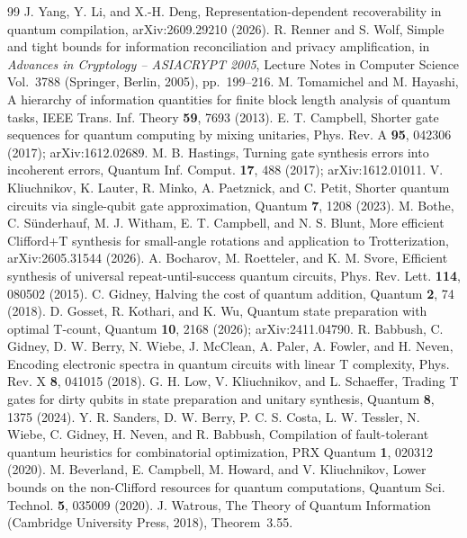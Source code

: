 \documentclass[aps,prx,twocolumn,superscriptaddress,nofootinbib,longbibliography]{revtex4-2}
\theoremstyle{plain}
\theoremstyle{definition}
\theoremstyle{remark}
\begin{document}
\begin{thebibliography}{99}
 J. Yang, Y. Li, and X.-H. Deng, Representation-dependent recoverability in quantum compilation, arXiv:2609.29210 (2026).
 R. Renner and S. Wolf, Simple and tight bounds for information reconciliation and privacy amplification, in \emph{Advances in Cryptology -- ASIACRYPT 2005}, Lecture Notes in Computer Science Vol.~3788 (Springer, Berlin, 2005), pp.~199--216.
 M. Tomamichel and M. Hayashi, A hierarchy of information quantities for finite block length analysis of quantum tasks, IEEE Trans. Inf. Theory \textbf{59}, 7693 (2013).
 E. T. Campbell, Shorter gate sequences for quantum computing by mixing unitaries, Phys. Rev. A \textbf{95}, 042306 (2017); arXiv:1612.02689.
 M. B. Hastings, Turning gate synthesis errors into incoherent errors, Quantum Inf. Comput. \textbf{17}, 488 (2017); arXiv:1612.01011.
 V. Kliuchnikov, K. Lauter, R. Minko, A. Paetznick, and C. Petit, Shorter quantum circuits via single-qubit gate approximation, Quantum \textbf{7}, 1208 (2023).
 M. Bothe, C. S\"underhauf, M. J. Witham, E. T. Campbell, and N. S. Blunt, More efficient Clifford+T synthesis for small-angle rotations and application to Trotterization, arXiv:2605.31544 (2026).
 A. Bocharov, M. Roetteler, and K. M. Svore, Efficient synthesis of universal repeat-until-success quantum circuits, Phys. Rev. Lett. \textbf{114}, 080502 (2015).
 C. Gidney, Halving the cost of quantum addition, Quantum \textbf{2}, 74 (2018).
 D. Gosset, R. Kothari, and K. Wu, Quantum state preparation with optimal T-count, Quantum \textbf{10}, 2168 (2026); arXiv:2411.04790.
 R. Babbush, C. Gidney, D. W. Berry, N. Wiebe, J. McClean, A. Paler, A. Fowler, and H. Neven, Encoding electronic spectra in quantum circuits with linear T complexity, Phys. Rev. X \textbf{8}, 041015 (2018).
 G. H. Low, V. Kliuchnikov, and L. Schaeffer, Trading T gates for dirty qubits in state preparation and unitary synthesis, Quantum \textbf{8}, 1375 (2024).
 Y. R. Sanders, D. W. Berry, P. C. S. Costa, L. W. Tessler, N. Wiebe, C. Gidney, H. Neven, and R. Babbush, Compilation of fault-tolerant quantum heuristics for combinatorial optimization, PRX Quantum \textbf{1}, 020312 (2020).
 M. Beverland, E. Campbell, M. Howard, and V. Kliuchnikov, Lower bounds on the non-Clifford resources for quantum computations, Quantum Sci. Technol. \textbf{5}, 035009 (2020).
 J. Watrous, The Theory of Quantum Information (Cambridge University Press, 2018), Theorem~3.55.
\end{thebibliography}
\end{document}
